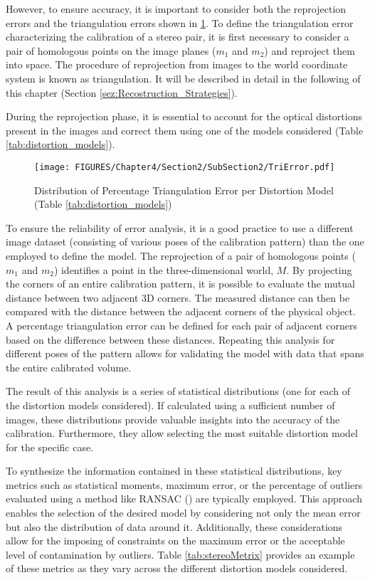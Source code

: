 However, to ensure accuracy, it is important to consider both the reprojection errors and the triangulation errors shown in \ref{fig:TriError}.
To define the triangulation error characterizing the calibration of a stereo pair, it is first necessary to consider a pair of homologous points on the image planes ($m_1$ and $m_2$) and reproject them into space. The procedure of reprojection from images to the world coordinate system is known as triangulation. It will be described in detail in the following of this chapter (Section \ref{sez:Recostruction_Strategies}). 

During the reprojection phase, it is essential to account for the optical distortions present in the images and correct them using one of the models considered (Table \ref{tab:distortion_models}).

\begin{figure}[!h]
  \centering
  \texttt{[image: FIGURES/Chapter4/Section2/SubSection2/TriError.pdf]}
  \caption{Distribution of Percentage Triangulation Error per Distortion Model (Table \ref{tab:distortion_models})}
  \label{fig:TriError}  
\end{figure}

To ensure the reliability of error analysis, it is a good practice to use a different image dataset (consisting of various poses of the calibration pattern) than the one employed to define the model. 
The reprojection of a pair of homologous points ($m_1$ and $m_2$) identifies a point in the three-dimensional world, $M$.
By projecting the corners of an entire calibration pattern, it is possible to evaluate the mutual distance between two adjacent 3D corners. The measured distance can then be compared with the distance between the adjacent corners of the physical object. 
A percentage triangulation error can be defined for each pair of adjacent corners based on the difference between these distances.
Repeating this analysis for different poses of the pattern allows for validating the model with data that spans the entire calibrated volume.

The result of this analysis is a series of statistical distributions (one for each of the distortion models considered). If calculated using a sufficient number of images, these distributions provide valuable insights into the accuracy of the calibration. Furthermore, they allow selecting the most suitable distortion model for the specific case.

To synthesize the information contained in these statistical distributions, key metrics such as statistical moments, maximum error, or the percentage of outliers evaluated using a method like RANSAC (\cite{Fischler1981}) are typically employed. This approach enables the selection of the desired model by considering not only the mean error but also the distribution of data around it. Additionally, these considerations allow for the imposing of constraints on the maximum error or the acceptable level of contamination by outliers.
Table \ref{tab:stereoMetrix} provides an example of these metrics as they vary across the different distortion models considered.

